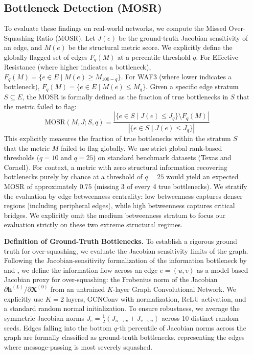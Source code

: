 \documentclass[10pt]{article} %
\begin{document}
\subsection{Bottleneck Detection (MOSR)}
To evaluate these findings on real-world networks, we compute the Missed Over-Squashing Ratio (MOSR). Let $J(e)$ be the ground-truth Jacobian sensitivity of an edge, and $M(e)$ be the structural metric score. We explicitly define the globally flagged set of edges $F_q(M)$ at a percentile threshold $q$. For Effective Resistance (where higher indicates a bottleneck), $F_q(M) = \{e \in E \mid M(e) \ge M_{100-q}\}$. For WAF3 (where lower indicates a bottleneck), $F_q(M) = \{e \in E \mid M(e) \le M_q\}$. Given a specific edge stratum $S \subseteq E$, the MOSR is formally defined as the fraction of true bottlenecks in $S$ that the metric failed to flag:
\begin{equation}
\text{MOSR}(M, J; S, q) = \frac{|\{ e \in S \mid J(e) \le J_q \} \setminus F_q(M)|}{|\{ e \in S \mid J(e) \le J_q \}|}
\end{equation}
This explicitly measures the fraction of true bottlenecks within the stratum $S$ that the metric $M$ failed to flag globally. We use strict global rank-based thresholds ($q=10$ and $q=25$) on standard benchmark datasets (Texas and Cornell). For context, a metric with zero structural information recovering bottlenecks purely by chance at a threshold of $q=25$ would yield an expected MOSR of approximately $0.75$ (missing 3 of every 4 true bottlenecks). We stratify the evaluation by edge betweenness centrality: low betweenness captures denser regions (including peripheral edges), while high betweenness captures critical bridges. We explicitly omit the medium betweenness stratum to focus our evaluation strictly on these two extreme structural regimes.

\textbf{Definition of Ground-Truth Bottlenecks.}
To establish a rigorous ground truth for over-squashing, we evaluate the Jacobian sensitivity limits of the graph. Following the Jacobian-sensitivity formalization of the information bottleneck by \citet{Topping2022} and \citet{DiGiovanni2023}, we define the information flow across an edge $e=(u,v)$ as a model-based Jacobian proxy for over-squashing: the Frobenius norm of the Jacobian $\partial \mathbf{h}^{(L)} / \partial \mathbf{X}^{(0)}$ from an untrained $K$-layer Graph Convolutional Network. We explicitly use $K=2$ layers, GCNConv with normalization, ReLU activation, and a standard random normal initialization. To ensure robustness, we average the symmetric Jacobian norms $J_e = \frac{1}{2} (J_{u \to v} + J_{v \to u})$ across 10 distinct random seeds. Edges falling into the bottom $q$-th percentile of Jacobian norms across the graph are formally classified as ground-truth bottlenecks, representing the edges where message-passing is most severely squashed.
\end{document}
